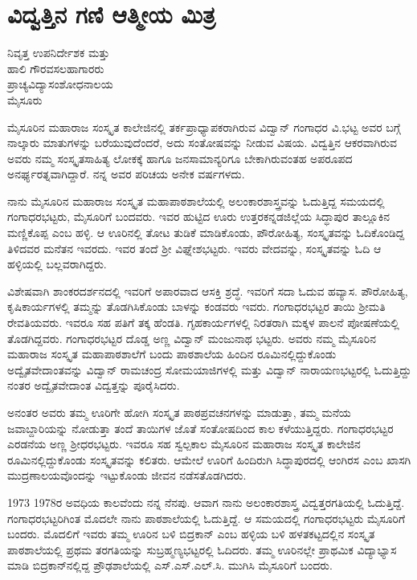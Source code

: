 {\fontsize{14}{16}\selectfont
\chapter{ವಿದ್ವತ್ತಿನ ಗಣಿ ಆತ್ಮೀಯ ಮಿತ್ರ}

\begin{center}
\smallskip
ನಿವೃತ್ತ ಉಪನಿರ್ದೇಶಕ ಮತ್ತು\\ 
ಹಾಲಿ ಗೌರವಸಲಹಾಗಾರರು\\
ಪ್ರಾಚ್ಯವಿದ್ಯಾಸಂಶೋಧನಾಲಯ\\
ಮೈಸೂರು
\addrule
\end{center}

ಮೈಸೂರಿನ ಮಹಾರಾಜ ಸಂಸ್ಕೃತ ಕಾಲೇಜಿನಲ್ಲಿ ತರ್ಕಪ್ರಾಧ್ಯಾಪಕರಾಗಿರುವ ವಿದ್ವಾನ್ ಗಂಗಾಧರ ವಿ.ಭಟ್ಟ ಅವರ ಬಗ್ಗೆ ನಾಲ್ಕಾರು ಮಾತುಗಳನ್ನು ಬರೆಯುವುದೆಂದರೆ, ಅದು ಸಂತೋಷವನ್ನು ನೀಡುವ ವಿಷಯ. ವಿದ್ವತ್ತಿನ ಆಕರವಾಗಿರುವ ಅವರು ನಮ್ಮ ಸಂಸ್ಕೃತಸಾಹಿತ್ಯ ಲೋಕಕ್ಕೆ ಹಾಗೂ ಜನಸಾಮಾನ್ಯರಿಗೂ ಬೇಕಾಗಿರುವಂತಹ ಅಪರೂಪದ ಅನರ್ಘ್ಯರತ್ನವಾಗಿದ್ದಾರೆ. ನನ್ನ ಅವರ ಪರಿಚಯ ಅನೇಕ ವರ್ಷಗಳದು. 

ನಾನು ಮೈಸೂರಿನ ಮಹಾರಾಜ ಸಂಸ್ಕೃತ ಮಹಾಪಾಠಶಾಲೆಯಲ್ಲಿ ಅಲಂಕಾರ\-ಶಾಸ್ತ್ರವನ್ನು ಓದುತ್ತಿದ್ದ ಸಮಯದಲ್ಲಿ ಗಂಗಾಧರಭಟ್ಟರು, ಮೈಸೂರಿಗೆ ಬಂದವರು. ಇವರ ಹುಟ್ಟಿದ ಊರು ಉತ್ತರಕನ್ನಡಜಿಲ್ಲೆಯ ಸಿದ್ಧಾಪುರ ತಾಲ್ಲೂಕಿನ ಮಣ್ಣಿಕೊಪ್ಪ ಎಂಬ ಹಳ್ಳಿ. ಆ ಊರಿನಲ್ಲಿ ತೋಟ  \enginline{-}  ತುಡಿಕೆ ಮಾಡಿಕೊಂಡು, ಪೌರೋಹಿತ್ಯ, ಸಂಸ್ಕೃತವನ್ನು ಓದಿಕೊಂಡಿದ್ದ ತಿಳಿದವರ ಮನೆತನ ಇವರದು. ಇವರ ತಂದೆ ಶ್ರೀ ವಿಘ್ನೇಶಭಟ್ಟರು. ಇವರು ವೇದವನ್ನು, ಸಂಸ್ಕೃತವನ್ನು ಓದಿ ಆ ಹಳ್ಳಿಯಲ್ಲಿ ಬಲ್ಲವರಾಗಿದ್ದರು.

ವಿಶೇಷವಾಗಿ ಶಾಂಕರದರ್ಶನದಲ್ಲಿ ಇವರಿಗೆ ಅಪಾರವಾದ ಆಸಕ್ತಿ ಶ್ರದ್ಧೆ. ಇವರಿಗೆ ಸದಾ ಓದುವ ಹವ್ಯಾಸ. ಪೌರೋಹಿತ್ಯ, ಕೃಷಿಕಾರ್ಯಗಳಲ್ಲಿ ತಮ್ಮನ್ನು ತೊಡಗಿಸಿಕೊಂಡು ಬಾಳನ್ನು ಕಂಡವರು ಇವರು. ಗಂಗಾಧರಭಟ್ಟರ ತಾಯಿ ಶ್ರೀಮತಿ ರೇವತಿಯವರು. ಇವರೂ ಸಹ ಪತಿಗೆ ತಕ್ಕ ಹೆಂಡತಿ. ಗೃಹಕಾರ್ಯಗಳಲ್ಲಿ ನಿರತರಾಗಿ ಮಕ್ಕಳ ಪಾಲನೆ ಪೋಷಣೆಯಲ್ಲಿ ತೊಡಗಿದ್ದವರು. ಗಂಗಾಧರಭಟ್ಟರ ದೊಡ್ಡ ಅಣ್ಣ ವಿದ್ವಾನ್ ಮಂಜುನಾಥ ಭಟ್ಟರು. ಅವರು ನಮ್ಮ ಮೈಸೂರಿನ ಮಹಾರಾಜ ಸಂಸ್ಕೃತ ಮಹಾ\-ಪಾಠಶಾಲೆಗೆ ಬಂದು ಪಾಠಶಾಲೆಯ ಹಿಂದಿನ ರೂಮಿನಲ್ಲಿದ್ದುಕೊಂಡು ಅದ್ವೈತವೇದಾಂತ\-ವನ್ನು ವಿದ್ವಾನ್ ರಾಮಚಂದ್ರ ಸೋಮಯಾಜಿಗಳಲ್ಲಿ ಮತ್ತು ವಿದ್ವಾನ್ ನಾರಾಯಣಭಟ್ಟರಲ್ಲಿ ಓದುತ್ತಿದ್ದು ನಂತರ ಅದ್ವೈತವೇದಾಂತ ವಿದ್ವತ್ತನ್ನು ಪೂರೈಸಿದರು. 
\vskip 3pt

ಅನಂತರ ಅವರು ತಮ್ಮ ಊರಿಗೇ ಹೋಗಿ ಸಂಸ್ಕೃತ ಪಾಠಪ್ರವಚನಗಳನ್ನು ಮಾಡುತ್ತಾ, ತಮ್ಮ ಮನೆಯ ಜವಾಬ್ದಾರಿಯನ್ನು ನೋಡುತ್ತಾ ತಂದೆ  \enginline{-}  ತಾಯಿಗಳ ಜೊತೆ ಸಂತೋಷದಿಂದ ಕಾಲ ಕಳೆಯುತ್ತಿದ್ದರು. ಗಂಗಾಧರಭಟ್ಟರ ಎರಡನೆಯ ಅಣ್ಣ ಶ್ರೀಧರಭಟ್ಟರು. ಇವರೂ ಸಹ ಸ್ವಲ್ಪಕಾಲ ಮೈಸೂರಿನ ಮಹಾರಾಜ ಸಂಸ್ಕೃತ ಕಾಲೇಜಿನ ರೂಮಿನಲ್ಲಿದ್ದುಕೊಂಡು ಸಂಸ್ಕೃತವನ್ನು ಕಲಿತರು. ಆಮೇಲೆ ಊರಿಗೆ ಹಿಂದಿರುಗಿ ಸಿದ್ಧಾಪುರದಲ್ಲಿ ಆಂಗಿರಸ ಎಂಬ ಖಾಸಗಿ ಮುದ್ರಣಾಲಯವೊಂದನ್ನು ಇಟ್ಟುಕೊಂಡು ಜೀವನ ನಡೆಸತೊಡಗಿದರು.
\vskip 3pt

1973  \enginline{-}  1978ರ ಅವಧಿಯ ಕಾಲವೆಂದು ನನ್ನ ನೆನಪು. ಆವಾಗ ನಾನು ಅಲಂಕಾರ\-ಶಾಸ್ತ್ರ ವಿದ್ವತ್ತರಗತಿಯಲ್ಲಿ ಓದುತ್ತಿದ್ದೆ. ಗಂಗಾಧರಭಟ್ಟರಿಗಿಂತ ಮೊದಲೇ ನಾನು ಪಾಠಶಾಲೆಯಲ್ಲಿ ಓದುತ್ತಿದ್ದೆ. ಆ ಸಮಯದಲ್ಲಿ ಗಂಗಾಧರಭಟ್ಟರು ಮೈಸೂರಿಗೆ ಬಂದರು. ಮೊದಲಿಗೆ ಇವರು ತಮ್ಮ ಊರಿನ ಬಳಿ ಬಿದ್ರಕಾನ್ ಎಂಬ ಹಳ್ಳಿಯ ಬಳಿ ಹಳತಕಟ್ಟದಲ್ಲಿನ ಸಂಸ್ಕೃತ ಪಾಠಶಾಲೆಯಲ್ಲಿ ಪ್ರಥಮ ತರಗತಿಯನ್ನು ಸುಬ್ರಹ್ಮಣ್ಯಭಟ್ಟರಲ್ಲಿ ಓದಿದರು. ತಮ್ಮ ಊರಿನಲ್ಲೇ ಪ್ರಾಥಮಿಕ ವಿದ್ಯಾಭ್ಯಾಸ ಮಾಡಿ ಬಿದ್ರಕಾನ್‍ನಲ್ಲಿದ್ದ ಪ್ರೌಢ\-ಶಾಲೆಯಲ್ಲಿ ಎಸ್.ಎಸ್.ಎಲ್.ಸಿ. ಮುಗಿಸಿ ಮೈಸೂರಿಗೆ ಬಂದರು.
\vskip 3pt

}
